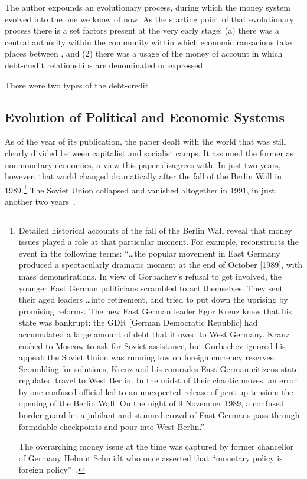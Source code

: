 The author expounds an evolutionary process, during which the money system evolved into the one we know of now. As the starting point of that evolutionary process there is a set factors present at the very early stage: (a) there was a central authority within the community within which economic ransacions take places between , and (2) there was a usage of the money of account in which debt-credit relationships are denominated or expressed. 

There were two types of the debt-credit 

\subsection{Evolution of Political and Economic Systems}

As of the year of its publication, the paper dealt with the world that was still clearly divided between capitalist and socialist camps. It assumed the former as nonmonetary economies, a view this paper disagrees with. In just two years, however, that world changed dramatically after the fall of the Berlin Wall in 1989.\footnote{Detailed historical accounts of the fall of the Berlin Wall reveal that money issues played a role at that particular moment. For example, \citeauthor{zubok2021} reconstructs the event in the following terms: ``\dots the popular movement in East Germany produced a spectacularly dramatic moment at the end of October [1989], with mass demonstrations. In view of Gorbachev's refusal to get involved, the younger East German politicians scrambled to act themselves. They sent their aged leaders \dots into retirement, and tried to put down the uprising by promising reforms. The new East German leader Egor Krenz knew that his state was bankrupt: the GDR [German Democratic Republic] had accumulated a large amount of debt that it owed to West Germany. Kranz rushed to Moscow to ask for Soviet assistance, but Gorbachev ignored his appeal: the Soviet Union was running low on foreign currency reserves. Scrambling for solutions, Krenz and his comrades East German citizens state-regulated travel to West Berlin. In the midst of their chaotic moves, an error by one confused official led to an unexpected release of pent-up tension: the opening of the Berlin Wall. On the night of 9 November 1989, a confused border guard let a jubilant and stunned crowd of East Germans pass through formidable checkpoints and pour into West Berlin.''~\citep[p.~93]{zubok2021}\par The overarching money issue at the time was captured by former chancellor of Germany Helmut Schmidt who once asserted that ``monetary policy is foreign policy''~\citep[quoted in][p.~49]{blackwill}.} The Soviet Union collapsed and vanished altogether in 1991, in just another two years~\citep{zubok2021}. 

